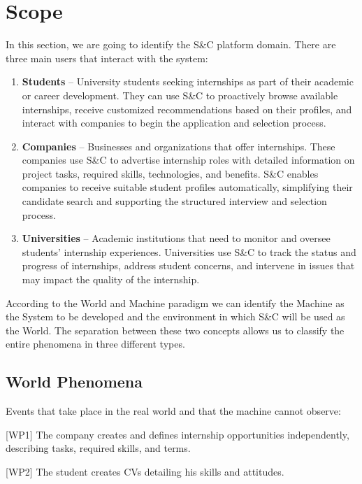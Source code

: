 \section{Scope}
\label{sec:scope}%

In this section, we are going to identify the S\&C platform domain. There
are three main users that interact with the system:~

\begin{enumerate}
\def\labelenumi{\arabic{enumi}.}
\item
  \textbf{Students} -- University students seeking internships as part of their academic or career development. They can use S\&C to
  proactively browse available internships, receive customized recommendations based on their profiles, and interact with companies to begin the application and selection process.
\item
  \textbf{Companies} -- Businesses and organizations that offer internships. These companies use S\&C to advertise internship roles with detailed information on project tasks, required skills,
  technologies, and benefits. S\&C enables companies to receive suitable student profiles automatically, simplifying their candidate search and supporting the structured interview and selection process.
\item
  \textbf{Universities} -- Academic institutions that need to monitor
  and oversee students' internship experiences. Universities use S\&C to
  track the status and progress of internships, address student
  concerns, and intervene in issues that may impact the quality of the
  internship.
\end{enumerate}

According to the World and Machine paradigm we can identify the Machine
as the System to be developed and the environment in which S\&C will be
used as the World. The separation between these two concepts allows us
to classify the entire phenomena in three different types.

\subsection{World Phenomena}
\label{subsec:world_phenomena}%

Events that take place in the real world and that the machine cannot
observe:

{[}WP1{]} The company creates and defines internship opportunities
independently, describing tasks, required skills, and terms.

{[}WP2{]} The student creates CVs detailing his skills and attitudes.

